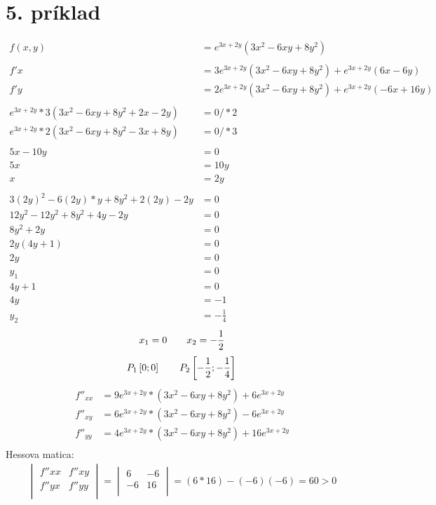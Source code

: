 \documentclass[a4paper]{article}
\begin{document}
	\section*{5. príklad}
		\begin{align*}
			f(x,y) &= e^{3x+2y}(3x^2 - 6xy +8y^2)\\
			\\
			f'x &= 3e^{3x+2y}(3x^2 - 6xy +8y^2) + e^{3x+2y}(6x - 6y)\\
			f'y &= 2e^{3x+2y}(3x^2 - 6xy +8y^2) + e^{3x+2y}(-6x + 16y)\\
			\\
			e^{3x+2y}*3(3x^2 - 6xy +8y^2 + 2x - 2y) &= 0 /*2\\
			e^{3x+2y}*2(3x^2 - 6xy +8y^2 - 3x + 8y) &= 0 /*3\\
			\\
			5x - 10y &= 0\\
			5x &= 10y\\
			x &= 2y\\
			\\
			3(2y)^2 - 6(2y)*y + 8y^2 + 2(2y) - 2y &= 0\\
			12y^2 - 12y^2 + 8y^2 +4y - 2y &= 0\\
			8y^2 + 2y &= 0\\
			2y(4y+1) &= 0\\
			2y &= 0 \\
			y_1 &= 0 \\
			4y+1 &= 0\\
			4y &= - 1\\
			y_2 &= - \frac{1}{4}
		\end{align*}
		$$x_1 = 0\qquad x_2 = - \frac{1}{2}\\$$
		$$P_1\left[0;0\right]\qquad P_2\left[-\frac{1}{2};-\frac{1}{4}\right]\\$$
		\begin{align*}
			f''_{xx} &= 9e^{3x+2y}*(3x^2 - 6xy + 8y^2) + 6e^{3x+2y}\\
			f''_{xy} &= 6e^{3x+2y}*(3x^2 - 6xy + 8y^2) - 6e^{3x+2y}\\
			f''_{yy} &= 4e^{3x+2y}*(3x^2 - 6xy + 8y^2) + 16e^{3x+2y}\\
		\end{align*}
		Hessova matica:\\
		\begin{align*}
			\begin{vmatrix}
				f''xx & f''xy\\
				f''yx & f''yy\\
			\end{vmatrix}
			=
			\begin{vmatrix}
				6 & -6\\
				-6 & 16\\
			\end{vmatrix}
			= (6*16) - (-6)(-6) = 60 > 0
		\end{align*}
\end{document}
